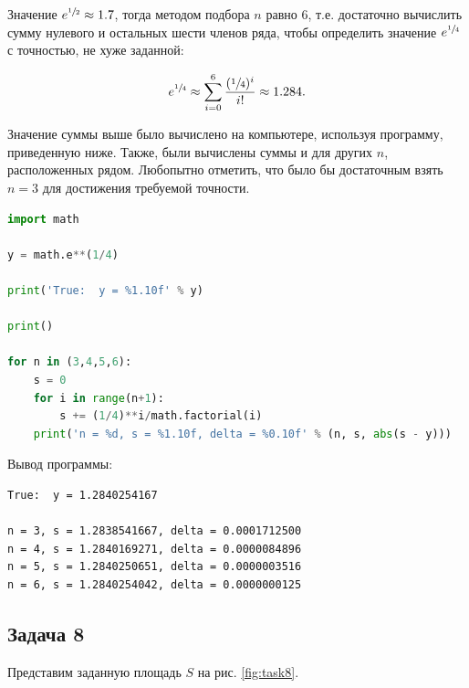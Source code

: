 \documentclass[a4paper,11pt]{article}
\begin{document}
Значение $e^{\sfrac{1}{2}} \approx 1.7$, тогда методом подбора $n$ равно 6, т.е. достаточно вычислить сумму нулевого и остальных шести членов ряда, чтобы определить значение $e^{\sfrac{1}{4}}$ с точностью, не хуже заданной:

\begin{align*}
e^{\sfrac{1}{4}} \approx \sum_{i=0}^{6} \frac{(\sfrac{1}{4})^i}{i!} \approx 1.284.
\end{align*}

Значение суммы выше было вычислено на компьютере, используя программу, приведенную ниже. Также, были вычислены суммы и для других $n$, расположенных рядом. Любопытно отметить, что было бы достаточным взять $n=3$ для достижения требуемой точности.

\begin{lstlisting}[language=Python, caption=Python-скрипт для приближенного вычисления $e^{\sfrac{1}{4}}$]
import math

y = math.e**(1/4)

print('True:  y = %1.10f' % y)

print()

for n in (3,4,5,6):
    s = 0
    for i in range(n+1):
        s += (1/4)**i/math.factorial(i)
    print('n = %d, s = %1.10f, delta = %0.10f' % (n, s, abs(s - y)))
\end{lstlisting}

\vspace{0.5cm}

Вывод программы:

\begin{verbatim}
True:  y = 1.2840254167

n = 3, s = 1.2838541667, delta = 0.0001712500
n = 4, s = 1.2840169271, delta = 0.0000084896
n = 5, s = 1.2840250651, delta = 0.0000003516
n = 6, s = 1.2840254042, delta = 0.0000000125
\end{verbatim}

\subsection{Задача 8}

Представим заданную площадь $S$ на рис. \ref{fig:task8}. 
\end{document}
